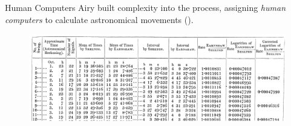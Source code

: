 \documentclass[presentation]{subfiles}
\begin{document}
\begin{frame}{Human Computers}
    Airy built complexity into the process, assigning \emph{human computers} 
    to calculate astronomical movements (\cite{grier2013computers}).

    \begin{figure}
    \includegraphics[width=\textwidth]{../common_figures/complexity/pw_literature/airy.png}
    \end{figure}
\end{frame}



\end{document}
